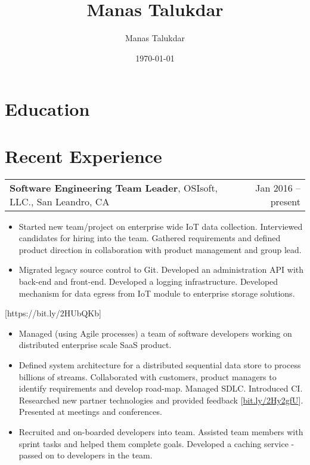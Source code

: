 \documentclass[letterpaper,10pt]{article}
\title{Manas Talukdar}
\author{Manas Talukdar}
\date{\today}
\makeatletter
\newcommand{\experienceItem}[3]{
	\begin{tabular*}{\textwidth}{c@{\extracolsep{\fill}}c}
		\multicolumn{1}{l}{\textbf{#1}, #2} & \multicolumn{1}{r}{#3}\\
	\end{tabular*}\vspace{-10pt}
}
\newcommand{\resumeItemListStart}{\begin{itemize}}
\newcommand{\resumeItemListEnd}{\end{itemize}}
\newcommand{\resumeListItem}[1]{
	\item{#1 \vspace{-6pt}}
}
\makeatother
\begin{document}
\thispagestyle{empty}
	
	
	
	
	
	\section{Education}	
	
	

	\section{Recent Experience}
	
	\experienceItem{Software Engineering Team Leader}{OSIsoft, LLC., San Leandro, CA}{Jan 2016 -- present}

	
	\resumeItemListStart
	\resumeListItem {Started new team/project on enterprise wide IoT data collection. Interviewed candidates for hiring into the team. Gathered requirements and defined product direction in collaboration with product management and group lead.}
	\resumeListItem {Migrated legacy source control to Git. Developed an administration API with back-end and front-end. Developed a logging infrastructure. Developed mechanism for data egress from IoT module to enterprise storage solutions.}
	\resumeItemListEnd

	[https://bit.ly/2HUbQKb]%
	
	\resumeItemListStart
	\resumeListItem {Managed (using Agile processes) a team of software developers working on distributed enterprise scale SaaS product.}
	\resumeListItem {Defined system architecture for a distributed sequential data store to process billions of streams. Collaborated with customers, product managers to identify requirements and develop road-map. Managed SDLC. Introduced CI. Researched new partner technologies and provided feedback [\href{https://bit.ly/2Hy2gfU}{bit.ly/2Hy2gfU}]. Presented at meetings and conferences.}
	\resumeListItem {Recruited and on-boarded developers into team. Assisted team members with sprint tasks and helped them complete goals. Developed a caching service - passed on to developers in the team.}
	\resumeItemListEnd
\end{document}
